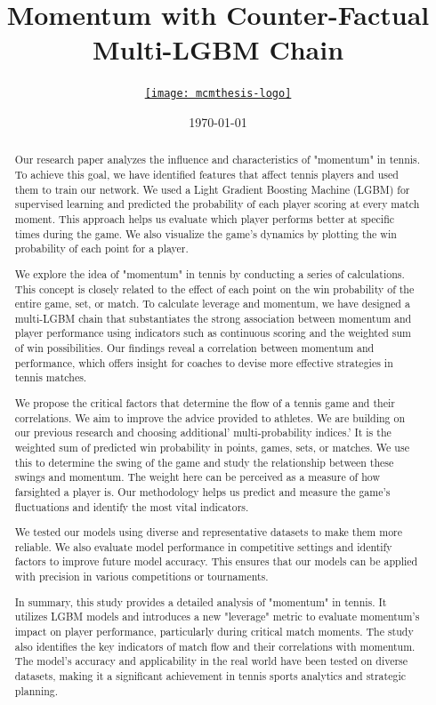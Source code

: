 \documentclass{mcmthesis}
\title{Momentum with Counter-Factual Multi-LGBM Chain}
\author{\small \href{https://www.latexstudio.net/}
  {\texttt{[image: mcmthesis-logo]}}}
\date{\today}
\begin{document}
\begin{abstract}
\par Our research paper analyzes the influence and characteristics of "momentum" in tennis. To achieve this goal, we have identified features that affect tennis players and used them to train our network. We used a Light Gradient Boosting Machine (LGBM) for supervised learning and predicted the probability of each player scoring at every match moment. This approach helps us evaluate which player performs better at specific times during the game. We also visualize the game's dynamics by plotting the win probability of each point for a player.

We explore the idea of "momentum" in tennis by conducting a series of calculations. This concept is closely related to the effect of each point on the win probability of the entire game, set, or match. To calculate leverage and momentum, we have designed a multi-LGBM chain that substantiates the strong association between momentum and player performance using indicators such as continuous scoring and the weighted sum of win possibilities. Our findings reveal a correlation between momentum and performance, which offers insight for coaches to devise more effective strategies in tennis matches.

We propose the critical factors that determine the flow of a tennis game and their correlations. We aim to improve the advice provided to athletes. We are building on our previous research and choosing additional' multi-probability indices.' It is the weighted sum of predicted win probability in points, games, sets, or matches. We use this to determine the swing of the game and study the relationship between these swings and momentum. The weight here can be perceived as a measure of how farsighted a player is. Our methodology helps us predict and measure the game's fluctuations and identify the most vital indicators.

We tested our models using diverse and representative datasets to make them more reliable. We also evaluate model performance in competitive settings and identify factors to improve future model accuracy. This ensures that our models can be applied with precision in various competitions or tournaments.

In summary, this study provides a detailed analysis of "momentum" in tennis. It utilizes LGBM models and introduces a new "leverage" metric to evaluate momentum's impact on player performance, particularly during critical match moments. The study also identifies the key indicators of match flow and their correlations with momentum. The model's accuracy and applicability in the real world have been tested on diverse datasets, making it a significant achievement in tennis sports analytics and strategic planning.


\end{abstract}
\end{document}
